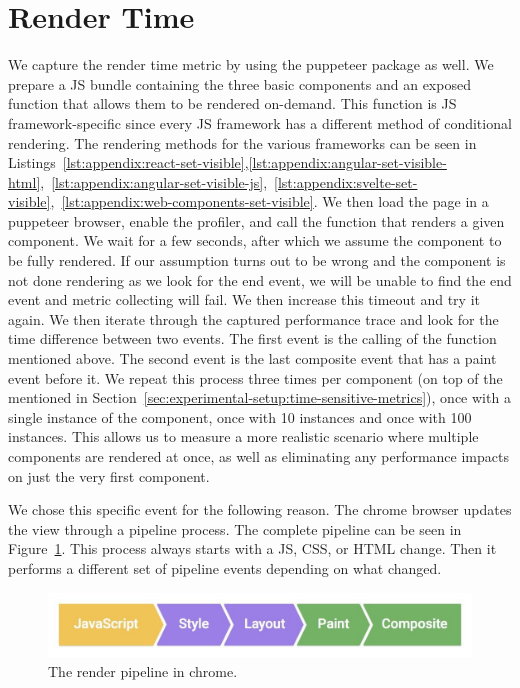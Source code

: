 \section{Render Time}
We capture the render time metric by using the puppeteer package as well. We prepare a JS bundle containing the three basic components and an exposed function that allows them to be rendered on-demand. This function is JS framework-specific since every JS framework has a different method of conditional rendering. The rendering methods for the various frameworks can be seen in Listings~\ref{lst:appendix:react-set-visible},\ref{lst:appendix:angular-set-visible-html},~\ref{lst:appendix:angular-set-visible-js},~\ref{lst:appendix:svelte-set-visible},~\ref{lst:appendix:web-components-set-visible}. We then load the page in a puppeteer browser, enable the profiler, and call the function that renders a given component. We wait for a few seconds, after which we assume the component to be fully rendered. If our assumption turns out to be wrong and the component is not done rendering as we look for the end event, we will be unable to find the end event and metric collecting will fail. We then increase this timeout and try it again. We then iterate through the captured performance trace and look for the time difference between two events. The first event is the calling of the function mentioned above. The second event is the last composite event that has a paint event before it. We repeat this process three times per component (on top of the \numMeasures{} mentioned in Section~\ref{sec:experimental-setup:time-sensitive-metrics}), once with a single instance of the component, once with 10 instances and once with 100 instances. This allows us to measure a more realistic scenario where multiple components are rendered at once, as well as eliminating any performance impacts on just the very first component.

We chose this specific event for the following reason. The chrome browser updates the view through a pipeline process. The complete pipeline can be seen in Figure~\ref{fig:experimental-setup:pipeline}. This process always starts with a JS, CSS, or HTML change. Then it performs a different set of pipeline events depending on what changed.

\begin{figure}[h]
  \includegraphics[width=\columnwidth]{figures/experimental-setup/render-pipeline.jpg}
  \caption{The render pipeline in chrome.}
  \label{fig:experimental-setup:pipeline}
  \centering
\end{figure}

